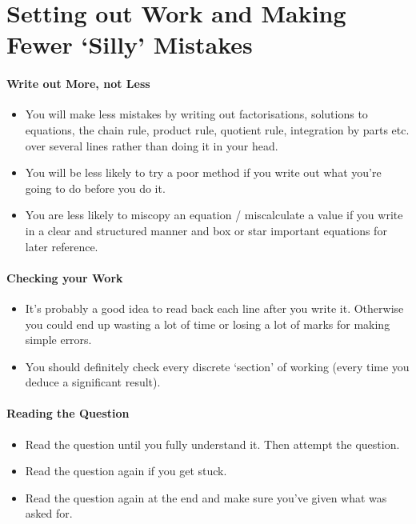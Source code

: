 \documentclass[9pt]{extarticle}
\begin{document}
	\section*{Setting out Work and Making Fewer `Silly' Mistakes}
	
	\thispagestyle{empty}
	
	\paragraph{Write out More, not Less}
	
	\begin{itemize}
		\item You will make less mistakes by writing out factorisations, solutions to equations, the chain rule, product rule, quotient rule, integration by parts etc. over several lines rather than doing it in your head.
		\item You will be less likely to try a poor method if you write out what you're going to do before you do it.
		\item You are less likely to miscopy an equation / miscalculate a value if you write in a clear and structured manner and box or star important equations for later reference.
	\end{itemize}
	
	\paragraph{Checking your Work}
	
	\begin{itemize}
		\item It's probably a good idea to read back each line after you write it. Otherwise you could end up wasting a lot of time or losing a lot of marks for making simple errors.
		\item You should definitely check every discrete `section' of working (every time you deduce a significant result).
	\end{itemize}
	
	\paragraph{Reading the Question}
	
	\begin{itemize}
		\item Read the question until you fully understand it. Then attempt the question.
		\item Read the question again if you get stuck.
		\item Read the question again at the end and make sure you've given what was asked for.
	\end{itemize}
	
\end{document}
